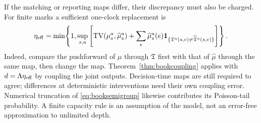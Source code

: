 \documentclass[11pt]{article}
\numberwithin{equation}{section}
\theoremstyle{definition}
\theoremstyle{remark}
\theoremstyle{definition}
\newcommand{\TV}{\operatorname{TV}}
\begin{document}
If the matching or reporting maps differ, their discrepancy must also be
charged. For finite marks a sufficient one-clock replacement is
\begin{equation}\label{eq:clearingdisagreement}
 \eta_{\rm eff}=\min\!\left\{1,\sup_{s,a}\left[
 \TV(\mu_s^a,\widehat\mu_s^a)+
 \sum_e\widehat\mu_s^a(e)
       \mathbf1_{\{\mathfrak T^a(s,e)\ne\widehat{\mathfrak T}^a(s,e)\}}
                       \right]\right\}.
\end{equation}
Indeed, compare the pushforward of $\mu$ through $\mathfrak T$ first with
that of $\widehat\mu$ through the same map, then change the map.
Theorem~\ref{thm:bookcoupling} applies with $d=\Lambda\eta_{\rm eff}$
by coupling the joint outputs. Decision-time maps are still required to
agree; differences at deterministic interventions need their own coupling
error. Numerical truncation of \eqref{eq:booksemigroup} likewise contributes
its Poisson-tail probability. A finite capacity rule is an assumption of the
model, not an error-free approximation to unlimited depth.
\end{document}
